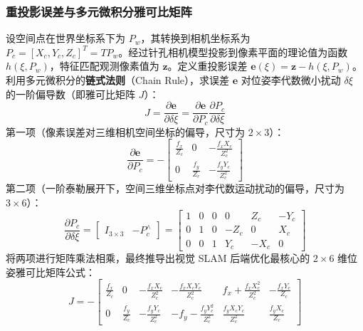 \documentclass[12pt,a4paper]{article}
\begin{document}
\subsubsection{重投影误差与多元微积分雅可比矩阵}
设空间点在世界坐标系下为 $P_w$，其转换到相机坐标系为 $P_c = [X_c, Y_c, Z_c]^T = T P_w$。经过针孔相机模型投影到像素平面的理论值为函数 $h(\xi, P_w)$，特征匹配观测像素值为 $\mathbf{z}$。定义重投影误差 $\mathbf{e}(\xi) = \mathbf{z} - h(\xi, P_w)$。\\
利用多元微积分的\textbf{链式法则}（Chain Rule），求误差 $\mathbf{e}$ 对位姿李代数微小扰动 $\delta \xi$ 的一阶偏导数（即雅可比矩阵 $J$）：
\begin{equation}
    J = \frac{\partial \mathbf{e}}{\partial \delta \xi} = \frac{\partial \mathbf{e}}{\partial P_c} \frac{\partial P_c}{\partial \delta \xi}
\end{equation}
第一项（像素误差对三维相机空间坐标的偏导，尺寸为 $2 \times 3$）：
\begin{equation}
    \frac{\partial \mathbf{e}}{\partial P_c} = - 
    \begin{bmatrix} 
        \frac{f_x}{Z_c} & 0 & -\frac{f_x X_c}{Z_c^2} \\ 
        0 & \frac{f_y}{Z_c} & -\frac{f_y Y_c}{Z_c^2} 
    \end{bmatrix}
\end{equation}
第二项（一阶泰勒展开下，空间三维坐标点对李代数运动扰动的偏导，尺寸为 $3 \times 6$）：
\begin{equation}
    \frac{\partial P_c}{\partial \delta \xi} = 
    \begin{bmatrix} 
        I_{3 \times 3} & -P_c^{\wedge} 
    \end{bmatrix} =
    \begin{bmatrix}
        1 & 0 & 0 & 0 & Z_c & -Y_c \\
        0 & 1 & 0 & -Z_c & 0 & X_c \\
        0 & 0 & 1 & Y_c & -X_c & 0
    \end{bmatrix}
\end{equation}
将两项进行矩阵乘法相乘，最终推导出视觉 SLAM 后端优化最核心的 $2 \times 6$ 维位姿雅可比矩阵公式：
\begin{equation}
    J = -
    \begin{bmatrix} 
        \frac{f_x}{Z_c} & 0 & -\frac{f_x X_c}{Z_c^2} & -\frac{f_x X_c Y_c}{Z_c^2} & f_x + \frac{f_x X_c^2}{Z_c^2} & -\frac{f_x Y_c}{Z_c} \\ 
        0 & \frac{f_y}{Z_c} & -\frac{f_y Y_c}{Z_c^2} & -f_y - \frac{f_y Y_c^2}{Z_c^2} & \frac{f_y X_c Y_c}{Z_c^2} & \frac{f_y X_c}{Z_c} 
    \end{bmatrix}
\end{equation}
\end{document}
